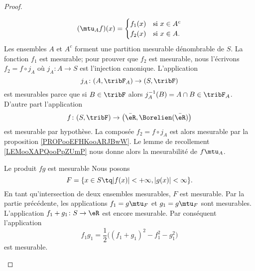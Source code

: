 \begin{proof}
\begin{subproof}
\begin{subproof}
            \begin{equation}
                (\mtu_Af)(x)=\begin{cases}
                    f_1(x)    &   \text{si \( x\in A^c\)}\\
                    f_2(x)    &    \text{si \( x\in  A\)}.
                \end{cases}
            \end{equation}
            Les ensembles \( A\) et $A^c$ forment une partition mesurable dénombrable de \( S\). La fonction \( f_1\) est mesurable; pour prouver que \( f_2\) est mesurable, nous l'écrivons \( f_2=f\circ j_A\) où \( j_A\colon A\to S\) est l'injection canonique. L'application
            \begin{equation}
                j_A\colon (A,\tribF_A)\to (S,\tribF)
            \end{equation}
            est mesurables parce que si \( B\in\tribF\) alors \( j_A^{-1}(B)=A\cap B\in\tribF_A\). D'autre part l'application
            \begin{equation}
                f\colon (S,\tribF)\to \big( \bar \eR,\Borelien(\bar \eR) \big)
            \end{equation}
            est mesurable par hypothèse. La composée \( f_2=f\circ j_A\) est alors mesurable par la proposition \ref{PROPooEFHKooARJBwW}. Le lemme de recollement \ref{LEMooXAPQooPpZUmP} nous donne alors la mesurabilité de \( f\mtu_A\).

        \item[Le produit \( fg\) est mesurable]
            Nous posons
            \begin{equation}
                F=\{ x\in S\tq | f(x) |<+\infty,| g(x) |<\infty \}.
            \end{equation}
            En tant qu'intersection de deux ensembles mesurables, \( F\) est mesurable. Par la partie précédente, les applications \( f_1=g\mtu_F\) et \( g_1=g\mtu_F\) sont mesurables. L'application \( f_1+g_1\colon S\to \eR\) est encore mesurable. Par conséquent l'application
            \begin{equation}
                f_1g_1=\frac{ 1 }{2}\big( (f_1+g_1)^2-f_1^2-g_1^2 \big)
            \end{equation}
            est mesurable.


\end{subproof}
\end{subproof}
\end{proof}

